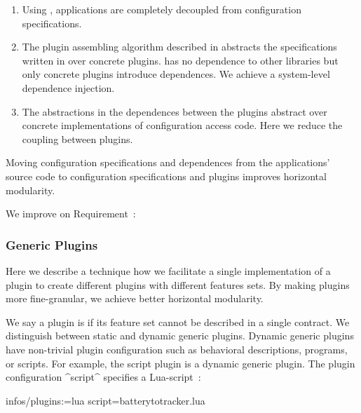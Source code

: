 \begin{enumerate}
\item
Using , applications are completely decoupled from configuration specifications.

\item
The plugin assembling algorithm described in  abstracts the specifications written in  over concrete plugins.
\elektra{} has no dependence to other libraries but only concrete plugins introduce dependences.
We achieve a system-level dependence injection.

\item
The  abstractions in the dependences between the plugins abstract over concrete implementations of configuration access code.
Here we reduce the coupling between plugins.
\end{enumerate}

\begin{finding}
Moving configuration specifications and dependences from the applications' source code to configuration specifications and plugins improves horizontal modularity.
\end{finding}

We improve on Requirement~:
\reqDependences*




\subsubsection{Generic Plugins}


Here we describe a technique how we facilitate a single implementation of a plugin to create different plugins with different features sets.
By making plugins more fine-granular, we achieve better horizontal modularity.


We say a plugin is  if its feature set cannot be described in a single contract.
We distinguish between static and dynamic generic plugins.
Dynamic generic plugins have non-trivial plugin configuration such as behavioral descriptions, programs, or scripts.
For example, the script plugin  is a dynamic generic plugin.
The plugin configuration ^script^ specifies a Lua-script~\cite{raab2016improving}:



\begin{code}
[locationtrackerd]
  infos/plugins:=lua script=batterytotracker.lua
\end{code}

